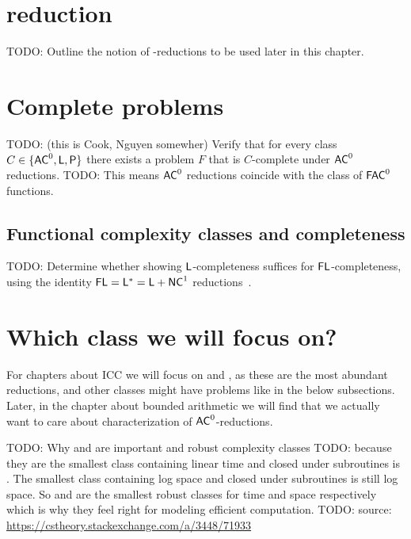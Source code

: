 \section{ reduction}
TODO: Outline the notion of -reductions to be used later in this chapter.

\section{Complete problems}
\label{sec:complete-problems}
TODO: (this is Cook, Nguyen somewher) Verify that for every class $C \in \{\mathsf{AC}^{0}, \mathsf{L}, \mathsf{P}\}$ there exists a problem $F$ that is $C$-complete under $\mathsf{AC}^{0}$ reductions.
TODO: This means $\mathsf{AC}^{0}$ reductions coincide with the class of $\mathsf{FAC}^{0}$ functions.

\subsection{Functional complexity classes and completeness}
TODO: Determine whether showing $\mathsf{L}$-completeness suffices for $\mathsf{FL}$-completeness, using the identity $\mathsf{FL} = \mathsf{L}^{*} = \mathsf{L} + \mathsf{NC}^{1}$ reductions~\cite[Proposition~4.1]{COOK19852}.

\section{Which class we will focus on?}
\label{sec:classes-of-interest}
For chapters about ICC we will focus on  and , as these are the most abundant reductions,
and other classes might have problems like in the below subsections.
Later, in the chapter about bounded arithmetic we will find that we actually want to care
about characterization of $\mathsf{AC}^{0}$-reductions.

TODO: Why  and  are important and robust complexity classes
TODO: because they are the smallest class containing linear time and closed under subroutines is . The smallest class containing log space and closed under subroutines is still log space. So  and  are the smallest robust classes for time and space respectively which is why they feel right for modeling efficient computation.  
TODO: source: \url{https://cstheory.stackexchange.com/a/3448/71933}

